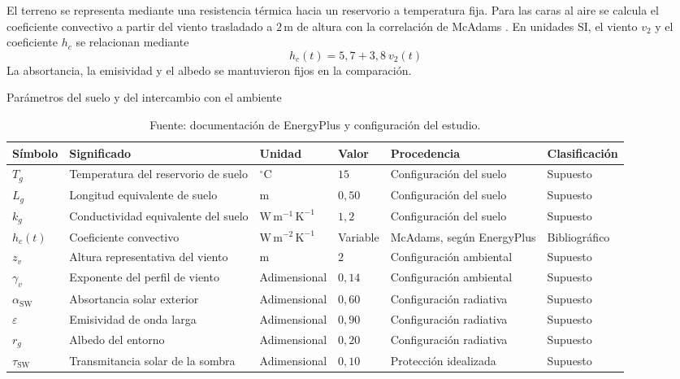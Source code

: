 El terreno se representa mediante una resistencia térmica hacia un reservorio a temperatura fija. Para las caras al aire se calcula el coeficiente convectivo a partir del viento trasladado a $2\,\mathrm m$ de altura con la correlación de McAdams \citep{energyplusMcAdams}. En unidades SI, el viento $v_2$ y el coeficiente $h_c$ se relacionan mediante
\begin{equation}
    h_c(t)=5{,}7+3{,}8~v_2(t)
\end{equation}
La absortancia, la emisividad y el albedo se mantuvieron fijos en la comparación.
\begin{table}[htbp]
  \centering
  \caption{Parámetros del suelo y del intercambio con el ambiente}
  \label{tab:param-ambiente}
  \small
  \setlength{\tabcolsep}{4pt}
  \begin{tabular}{L{1.4cm}L{3.5cm}L{2.1cm}L{1.8cm}L{3.8cm}L{2.2cm}}
    \toprule
    Símbolo & Significado & Unidad & Valor & Procedencia & Clasificación \\
    \midrule
    $T_g$ & Temperatura del reservorio de suelo & $^{\circ}\mathrm{C}$ & $15$ & Configuración del suelo & Supuesto \\
    $L_g$ & Longitud equivalente de suelo & $\mathrm{m}$ & $0{,}50$ & Configuración del suelo & Supuesto \\
    $k_g$ & Conductividad equivalente del suelo & $\mathrm{W\,m^{-1}\,K^{-1}}$ & $1{,}2$ & Configuración del suelo & Supuesto \\
    $h_c(t)$ & Coeficiente convectivo & $\mathrm{W\,m^{-2}\,K^{-1}}$ & Variable & McAdams, según EnergyPlus & Bibliográfico \\
    $z_v$ & Altura representativa del viento & $\mathrm{m}$ & $2$ & Configuración ambiental & Supuesto \\
    $\gamma_v$ & Exponente del perfil de viento & Adimensional & $0{,}14$ & Configuración ambiental & Supuesto \\
    $\alpha_{\mathrm{SW}}$ & Absortancia solar exterior & Adimensional & $0{,}60$ & Configuración radiativa & Supuesto \\
    $\varepsilon$ & Emisividad de onda larga & Adimensional & $0{,}90$ & Configuración radiativa & Supuesto \\
    $r_g$ & Albedo del entorno & Adimensional & $0{,}20$ & Configuración radiativa & Supuesto \\
    $\tau_{\mathrm{SW}}$ & Transmitancia solar de la sombra & Adimensional & $0{,}10$ & Protección idealizada & Supuesto \\
    \bottomrule
  \end{tabular}
  \captionsetup{skip=2pt}
  \caption*{Fuente: documentación de EnergyPlus y configuración del estudio.}
\end{table}
